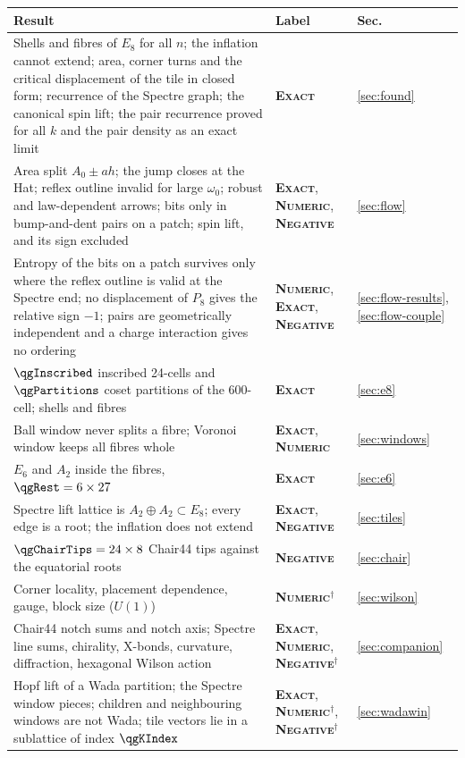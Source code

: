 \documentclass[11pt]{article}
\newcommand{\exact}{\textbf{\textsc{Exact}}}
\newcommand{\numeric}{\textbf{\textsc{Numeric}}}
\newcommand{\negres}{\textbf{\textsc{Negative}}}
\theoremstyle{definition}
\begin{document}
\begin{table}[t]
\centering\footnotesize
\begin{tabular}{@{}p{104mm}p{26mm}p{14mm}@{}}
\toprule
Result & Label & Sec. \\ \midrule
Shells and fibres of $E_8$ for all $n$; the inflation cannot extend; area, corner turns and the critical displacement of the tile in closed form; recurrence of the Spectre graph; the canonical spin lift; the pair recurrence proved for all $k$ and the pair density as an exact limit & \exact & \ref{sec:found} \\
Area split $A_0\pm a h$; the jump closes at the Hat; reflex outline invalid for large $\omega_0$; robust and law-dependent arrows; bits only in bump-and-dent pairs on a patch; spin lift, and its sign excluded & \exact, \numeric, \negres & \ref{sec:flow} \\
Entropy of the bits on a patch survives only where the reflex outline is valid at the Spectre end; no displacement of $P_8$ gives the relative sign $-1$; pairs are geometrically independent and a charge interaction gives no ordering & \numeric, \exact, \negres & \ref{sec:flow-results}, \ref{sec:flow-couple} \\
$\qgInscribed$ inscribed 24-cells and $\qgPartitions$ coset partitions of the 600-cell; shells and fibres & \exact & \ref{sec:e8} \\
Ball window never splits a fibre; Voronoi window keeps all fibres whole & \exact, \numeric & \ref{sec:windows} \\
$E_6$ and $A_2$ inside the fibres, $\qgRest=6\times27$ & \exact & \ref{sec:e6} \\
Spectre lift lattice is $A_2\oplus A_2\subset E_8$; every edge is a root; the inflation does not extend & \exact, \negres & \ref{sec:tiles} \\
$\qgChairTips=24\times8$ Chair44 tips against the equatorial roots & \negres & \ref{sec:chair} \\
Corner locality, placement dependence, gauge, block size ($U(1)$) & \numeric$^\dagger$ & \ref{sec:wilson} \\
Chair44 notch sums and notch axis; Spectre line sums, chirality, X-bonds, curvature, diffraction, hexagonal Wilson action & \exact, \numeric, \negres$^\dagger$ & \ref{sec:companion} \\
Hopf lift of a Wada partition; the Spectre window pieces; children and neighbouring windows are not Wada; tile vectors lie in a sublattice of index $\qgKIndex$ & \exact, \numeric$^\dagger$, \negres$^\dagger$ & \ref{sec:wadawin} \\

\end{tabular}
\end{table}
\end{document}
